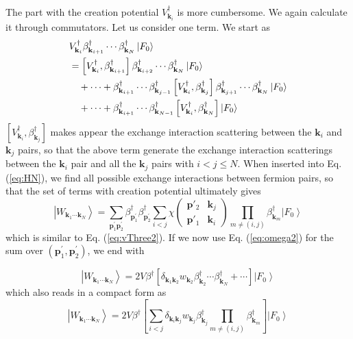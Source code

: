 \documentclass[aps,prb,superscriptaddress,showpacs,reprint,lengthcheck]{revtex4}
\newcommand{\vk}{\ensuremath{\mathbf{k}}}
\newcommand{\vp}{\ensuremath{\mathbf{p}}}
\begin{document}
 The part with the creation potential $V^\dagger_{\mathbf{k}_i}$ is more cumbersome.  We again calculate it through commutators.  Let us consider one term. We start as
\begin{equation}
\begin{split}
&V^{\dagger}_{\mathbf{k} _{i}}\beta^{\dagger}_{\mathbf{k} _{i+1}}\cdots\beta^{\dagger}_{\mathbf{k}
_N}\left|F_0\right> \\
&=\left[V^{\dagger}_{\mathbf{k} _{i}},\beta^{\dagger}_{\mathbf{k} _{i+1}}\right]  \beta^{\dagger}_{%
\mathbf{k} _{i+2}}\cdots\beta^{\dagger}_{\mathbf{k} _N}\left|F_0\right> \\
&\quad+\cdots+\beta^{\dagger}_{\mathbf{k} _{i+1}}\cdots\beta^{\dagger}_{\mathbf{k} _{j-1}}
\left[V^{\dagger}_{\mathbf{k} _{i}},\beta^{\dagger}_{\mathbf{k} _j}\right]  \beta^{\dagger}_{\mathbf{k}
_{j+1}}\cdots \beta^{\dagger}_{\mathbf{k}_{N}}\left|F_0\right>\\
&\quad+\cdots+\beta^{\dagger}_{\mathbf{k} _{i+1}}\cdots\beta^{\dagger}_{\mathbf{k} _{N-1}}
\left[V^{\dagger}_{\mathbf{k} _{i}},\beta^{\dagger}_{\mathbf{k} _N}\right] \left|F_0\right>
\end{split}
\end{equation}
 $\left[V^{\dagger}_{\mathbf{k} _{i}},\beta^{\dagger}_{\mathbf{k} _j}\right]$ makes appear the  exchange interaction scattering between the $\vk_i$ and $\vk_j$ pairs, so that the above term generate the exchange interaction scatterings between the $\mathbf{k} _{i}$ pair and all the $\mathbf{k} _{j}$ pairs with  $i<j\leq{N}$.  When inserted into Eq. (\ref{eq:HN}), we find all possible exchange interactions between fermion pairs, so that the set of terms with creation potential ultimately gives
\begin{equation}  
\left|W_{\mathbf{k} _1\cdots\mathbf{k} _N}\right>=\sum_{\vp^{\prime}_1\mathbf{p} ^{\prime}_2}\beta^{\dagger}_{\mathbf{p}
^{\prime}_1}\beta^{\dagger}_{\mathbf{p} ^{\prime}_2} \sum_{i<j}\chi\left(\begin{smallmatrix}\vp'_2&\vk_j\\\vp'_1&\vk_i%
\end{smallmatrix}\right)  \prod_{m\neq(i,j)}\beta^{\dagger}_{\mathbf{k} _m} \left|F_0\right>  
\end{equation}
 which is similar to Eq. (\ref{eq:vThree2}).  If we now use Eq. (\ref{eq:omega2}) for the sum over $(\vp^{\prime}_1,\mathbf{p} ^{\prime}_2)$, we end with 
 
  \begin{equation}  
\left|W_{\mathbf{k} _1\cdots\mathbf{k} _N}\right>=2V\beta^\dagger[ \delta_{\vk_1\vk_2}w_{\vk_2}\beta^{\dagger}_{\mathbf{k} _2}\cdots\beta^{\dagger}_{\mathbf{k} _N}+\cdots ]\left|F_0\right>  
\end{equation}
which also reads in a compact form as 
 \begin{equation}  
\left|W_{\mathbf{k} _1\cdots\mathbf{k} _N}\right>=2V\beta^\dagger\left[ \sum_{i<j}\delta_{\vk_i\vk_j}w_{\vk_j}\beta^\dagger_{\vk_j}\prod_{m\neq(i,j)}\beta^{\dagger}_{\mathbf{k} _m} \right]\left|F_0\right>  
\end{equation}
\end{document}
